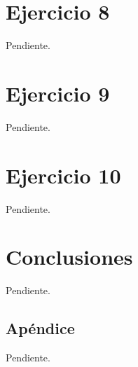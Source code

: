 \documentclass[a4paper,10pt,twoside]{article}
\begin{document}
\section{Ejercicio 8}

Pendiente.




\section{Ejercicio 9}

Pendiente.




\section{Ejercicio 10}

Pendiente.




\section{Conclusiones}

Pendiente.



\newpage

\begin{appendices}

\section{Apéndice}

Pendiente.


\end{appendices}
\end{document}
